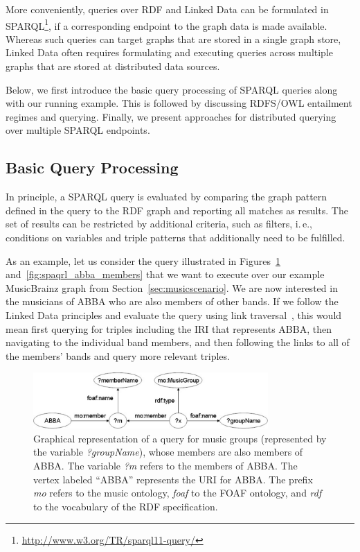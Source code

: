 \documentclass[a4paper,USenglish]{tgdk-v2021}
\begin{document}
More conveniently, queries over RDF and Linked Data can be formulated in SPARQL\footnote{\url{http://www.w3.org/TR/sparql11-query/}}, if a corresponding endpoint to the graph data is made available. 
Whereas such queries can target graphs that are stored in a single graph store, Linked Data often requires formulating and executing queries across multiple graphs that are stored at distributed data sources.

Below, we first introduce the basic query processing of SPARQL queries along with our running example.
This is followed by discussing RDFS/OWL entailment regimes and querying.
Finally, we present approaches for distributed querying over multiple SPARQL endpoints.

\subsection{Basic Query Processing}
\label{subsec:querying}

In principle, a SPARQL query is evaluated by comparing the graph pattern defined in the query to the RDF graph and reporting all matches as results. The set of results can be restricted by additional criteria, such as filters, i.\,e., conditions on variables and triple patterns that additionally need to be fulfilled.

As an example, let us consider the query illustrated in Figures~\ref{fig:spaqrl_abba_members_graph} and~\ref{fig:spaqrl_abba_members} that we want to execute over our example MusicBrainz graph from Section~\ref{sec:musicscenario}. 
We are now interested in the musicians of ABBA who are also members of other bands.
If we follow the Linked Data principles and evaluate the query using link traversal~\cite{DBLP:conf/esws/Hartig11}, this would mean first querying for triples including the IRI that represents ABBA, then navigating to the individual band members, and then following the links to all of the members' bands and query more relevant triples.

\begin{figure}[ht]
  \centering
  \includegraphics[width=0.8\textwidth]{figs/sparql-query}
\caption{Graphical representation of a query for music groups (represented by the variable \textit{?groupName}),
whose members are also members of ABBA. The variable \textit{?m} refers to the members of ABBA.
The vertex labeled ``ABBA'' represents the URI for ABBA.
The prefix \textit{mo} refers to the music ontology, \textit{foaf} to the FOAF ontology, and \textit{rdf} to the vocabulary of the RDF specification.
}
\label{fig:spaqrl_abba_members_graph}
\end{figure}
\end{document}
